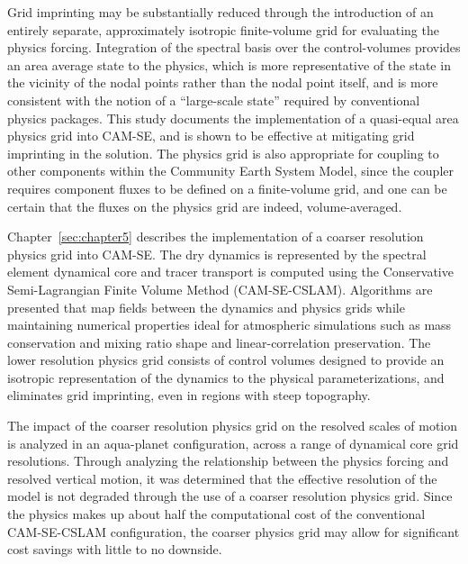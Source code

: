 Grid imprinting may be substantially reduced through the introduction of an entirely separate, approximately isotropic finite-volume grid for evaluating the physics forcing. Integration of the spectral basis over the control-volumes provides an area average state to the physics, which is more representative of the state in the vicinity of the nodal points rather than the nodal point itself, and is more consistent with the notion of a ``large-scale state'' required by conventional physics packages. This study documents the implementation of a quasi-equal area physics grid into CAM-SE, and is shown to be effective at mitigating grid imprinting in the solution. The physics grid is also appropriate for coupling to other components within the Community Earth System Model, since the coupler requires component fluxes to be defined on a finite-volume grid, and one can be certain that the fluxes on the physics grid are indeed, volume-averaged.

Chapter~\ref{sec:chapter5} describes the implementation of a coarser resolution physics grid into CAM-SE. The dry dynamics is represented by the spectral element dynamical core and tracer transport is computed using the Conservative Semi-Lagrangian Finite Volume Method (CAM-SE-CSLAM). Algorithms are presented that map fields between the dynamics and physics grids while maintaining numerical properties ideal for atmospheric simulations such as mass conservation and mixing ratio shape and linear-correlation preservation. The lower resolution physics grid consists of control volumes designed to provide an isotropic representation of the dynamics to the physical parameterizations, and eliminates grid imprinting, even in regions with steep topography. 

The impact of the coarser resolution physics grid on the resolved scales of motion is analyzed in an aqua-planet configuration, across a range of dynamical core grid resolutions. Through analyzing the relationship between the physics forcing and resolved vertical motion, it was determined that the effective resolution of the model is not degraded through the use of a coarser resolution physics grid. Since the physics makes up about half the computational cost of the conventional CAM-SE-CSLAM configuration, the coarser physics grid may allow for significant cost savings with little to no downside.

